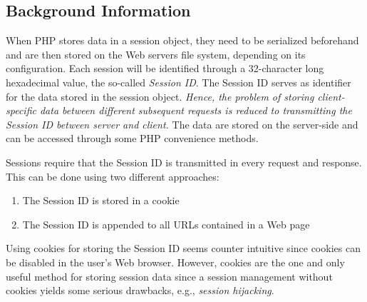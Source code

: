 \documentclass[a4paper, justified, notoc]{tufte-handout} %
\begin{document}
\subsection{Background Information} %
\label{sub:background_information}

When PHP stores data in a session object, they need to be serialized beforehand and are then stored on the Web servers file system, depending on its configuration. 
Each  session will be identified through a 32-character long hexadecimal value, the so-called \emph{Session ID}.
The Session ID serves as identifier for the data stored in the session object. 
\emph{Hence, the problem of storing client-specific data between different subsequent requests is reduced to transmitting the Session ID between server and client. }
The data are stored on the server-side and can be accessed through some PHP convenience methods. 

Sessions require that the Session ID is transmitted in every request and response.
This can be done using two different approaches:
\begin{enumerate}
	\item The Session ID is stored in a cookie
	\item The Session ID is appended to all URLs contained in a Web page
\end{enumerate}

Using cookies for storing the Session ID seems counter intuitive since cookies can be disabled in the user's Web browser. However, cookies are the one and only useful method for storing session data since a session management without cookies yields some serious drawbacks, e.g., \emph{session hijacking}.
\end{document}
